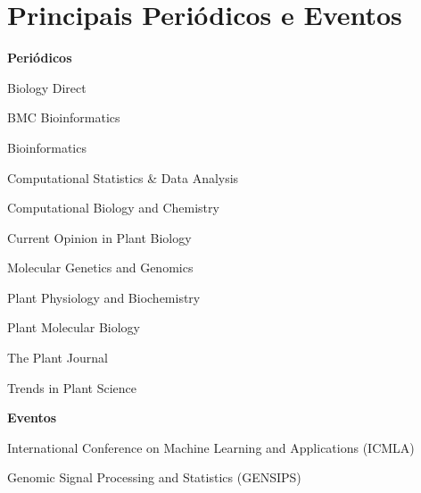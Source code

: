 \chapter{Principais Periódicos e Eventos}

{\bf \large Periódicos}


Biology Direct 

BMC Bioinformatics

Bioinformatics 

Computational Statistics \& Data Analysis 

Computational Biology and Chemistry

Current Opinion in Plant Biology

Molecular Genetics and Genomics

Plant Physiology and Biochemistry 

Plant Molecular Biology

The Plant Journal

Trends in Plant Science

{\bf \large Eventos}

International Conference on Machine Learning and Applications (ICMLA)

Genomic Signal Processing and Statistics (GENSIPS)
